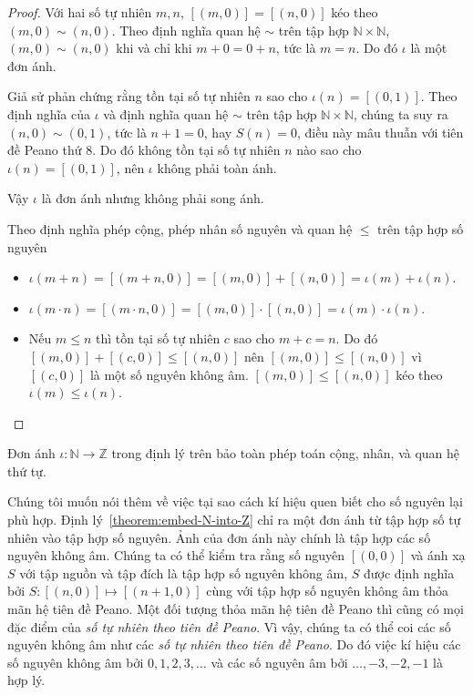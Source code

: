 \begin{proof}
    Với hai số tự nhiên $m, n$, $[(m, 0)] = [(n, 0)]$ kéo theo $(m, 0)\sim (n, 0)$. Theo định nghĩa quan hệ $\sim$ trên tập hợp $\mathbb{N}\times\mathbb{N}$, $(m, 0)\sim (n, 0)$ khi và chỉ khi $m + 0 = 0 + n$, tức là $m = n$. Do đó $\iota$ là một đơn ánh.

    Giả sử phản chứng rằng tồn tại số tự nhiên $n$ sao cho $\iota(n) = [(0, 1)]$. Theo định nghĩa của $\iota$ và định nghĩa quan hệ $\sim$ trên tập hợp $\mathbb{N}\times\mathbb{N}$, chúng ta suy ra $(n, 0)\sim (0, 1)$, tức là $n + 1 = 0$, hay $S(n) = 0$, điều này mâu thuẫn với tiên đề Peano thứ 8. Do đó không tồn tại số tự nhiên $n$ nào sao cho $\iota(n) = [(0, 1)]$, nên $\iota$ không phải toàn ánh.

    Vậy $\iota$ là đơn ánh nhưng không phải song ánh.

    Theo định nghĩa phép cộng, phép nhân số nguyên và quan hệ $\leq$ trên tập hợp số nguyên
    \begin{itemize}
        \item $\iota(m + n) = [(m + n, 0)] = [(m, 0)] + [(n, 0)] = \iota(m) + \iota(n)$.
        \item $\iota(m\cdot n) = [(m\cdot n, 0)] = [(m, 0)]\cdot [(n, 0)] = \iota(m)\cdot\iota(n)$.
        \item Nếu $m\leq n$ thì tồn tại số tự nhiên $c$ sao cho $m + c = n$. Do đó $[(m, 0)] + [(c, 0)]\leq [(n, 0)]$ nên $[(m, 0)]\leq [(n, 0)]$ vì $[(c, 0)]$ là một số nguyên không âm. $[(m, 0)]\leq [(n, 0)]$ kéo theo $\iota(m)\leq\iota(n)$.
    \end{itemize}
\end{proof}

Đơn ánh $\iota: \mathbb{N}\to \mathbb{Z}$ trong định lý trên bảo toàn phép toán cộng, nhân, và quan hệ thứ tự.

Chúng tôi muốn nói thêm về việc tại sao cách kí hiệu quen biết cho số nguyên lại phù hợp. Định lý~\ref{theorem:embed-N-into-Z} chỉ ra một đơn ánh từ tập hợp số tự nhiên vào tập hợp số nguyên. Ảnh của đơn ánh này chính là tập hợp các số nguyên không âm. Chúng ta có thể kiểm tra rằng số nguyên $[(0,0)]$ và ánh xạ $S$ với tập nguồn và tập đích là tập hợp số nguyên không âm, $S$ được định nghĩa bởi $S: [(n,0)] \mapsto [(n+1,0)]$ cùng với tập hợp số nguyên không âm thỏa mãn hệ tiên đề Peano. Một đối tượng thỏa mãn hệ tiên đề Peano thì cũng có mọi đặc điểm của \textit{số tự nhiên theo tiên đề Peano}. Vì vậy, chúng ta có thể coi các số nguyên không âm như các \textit{số tự nhiên theo tiên đề Peano}. Do đó việc kí hiệu các số nguyên không âm bởi $0, 1, 2, 3,\ldots$ và các số nguyên âm bởi $\ldots, -3, -2, -1$ là hợp lý.

